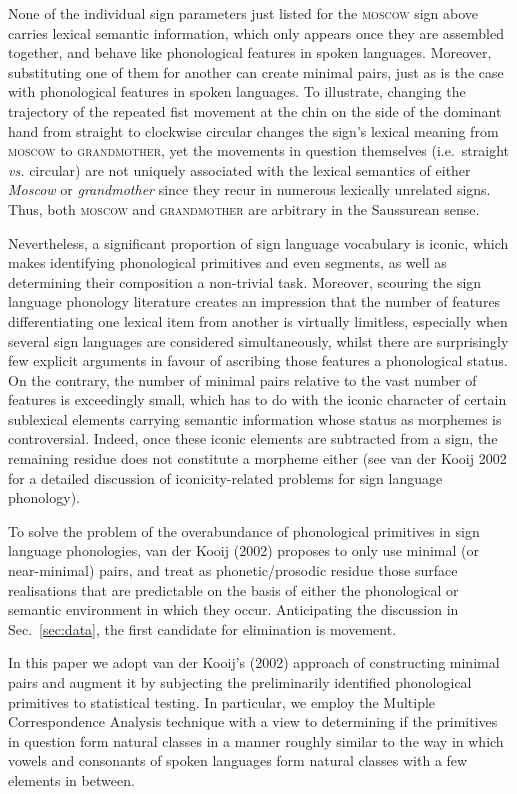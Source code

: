 None of the individual sign parameters just listed for the
\textsc{moscow} sign above carries lexical semantic information, which
only appears once they are assembled together, and behave like
phonological features in spoken languages. Moreover, substituting one of
them for another can create minimal pairs, just as is the case with
phonological features in spoken languages. To illustrate, changing the
trajectory of the repeated fist movement at the chin on the side of the
dominant hand from straight to clockwise circular changes the sign's
lexical meaning from \textsc{moscow} to \textsc{grandmother}, yet the
movements in question themselves (i.e.~straight \emph{vs.} circular) are
not uniquely associated with the lexical semantics of either
\emph{Moscow} or \emph{grandmother} since they recur in numerous
lexically unrelated signs. Thus, both \textsc{moscow} and
\textsc{grandmother} are arbitrary in the Saussurean sense.

Nevertheless, a significant proportion of sign language vocabulary is
iconic, which makes identifying phonological primitives and even
segments, as well as determining their composition a non-trivial task.
Moreover, scouring the sign language phonology literature creates an
impression that the number of features differentiating one lexical item
from another is virtually limitless, especially when several sign
languages are considered simultaneously, whilst there are surprisingly
few explicit arguments in favour of ascribing those features a
phonological status. On the contrary, the number of minimal pairs
relative to the vast number of features is exceedingly small, which has
to do with the iconic character of certain sublexical elements carrying
semantic information whose status as morphemes is controversial. Indeed,
once these iconic elements are subtracted from a sign, the remaining
residue does not constitute a morpheme either (see van der Kooij 2002
for a detailed discussion of iconicity-related problems for sign
language phonology).

To solve the problem of the overabundance of phonological primitives in
sign language phonologies, van der Kooij (2002) proposes to only use
minimal (or near-minimal) pairs, and treat as phonetic/prosodic residue
those surface realisations that are predictable on the basis of either
the phonological or semantic environment in which they occur.
Anticipating the discussion in Sec.~\ref{sec:data}, the first candidate
for elimination is movement.

In this paper we adopt van der Kooij's (2002) approach of constructing
minimal pairs and augment it by subjecting the preliminarily identified
phonological primitives to statistical testing. In particular, we employ
the Multiple Correspondence Analysis technique with a view to
determining if the primitives in question form natural classes in a
manner roughly similar to the way in which vowels and consonants of
spoken languages form natural classes with a few elements in between.

